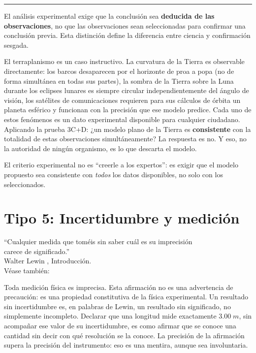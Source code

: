 \documentclass[11pt]{book}
\begin{document}
\begin{enumerate}
\begin{description}
\end{description}
\end{enumerate}

\medskip
\noindent\rule{\linewidth}{0.4pt}


\medskip
El análisis experimental exige que la conclusión sea {\bf deducida de las observaciones}, no que las observaciones sean seleccionadas para confirmar una conclusión previa. Esta distinción define la diferencia entre ciencia y confirmación sesgada.

El terraplanismo es un caso instructivo. La curvatura de la Tierra es observable directamente: los barcos desaparecen por el horizonte de proa a popa (no de forma simultánea en todas sus partes), la sombra de la Tierra sobre la Luna durante los eclipses lunares es siempre circular independientemente del ángulo de visión, los satélites de comunicaciones requieren para sus cálculos de órbita un planeta esférico y funcionan con la precisión que ese modelo predice. Cada uno de estos fenómenos es un dato experimental disponible para cualquier ciudadano. Aplicando la prueba 3C+D: ¿un modelo plano de la Tierra es {\bf consistente} con la totalidad de estas observaciones simultáneamente? La respuesta es no. Y eso, no la autoridad de ningún organismo, es lo que descarta el modelo.

El criterio experimental no es ``creerle a los expertos'': es exigir que el modelo propuesto sea consistente con {\it todos} los datos disponibles, no solo con los seleccionados.

\section{Tipo 5: Incertidumbre y medición}

{\small
\begin{flushright}
	``Cualquier medida que toméis sin saber cuál es su imprecisión\\
	carece de significado.''\\
	Walter Lewin \cite{Lewin2011}, Introducción.\\
	{\upshape\small Véase también: \cite{Lewin2011video}}
\end{flushright}
}

\medskip
Toda medición física es imprecisa. Esta afirmación no es una advertencia de precaución: es una propiedad constitutiva de la física experimental. Un resultado sin incertidumbre es, en palabras de Lewin, un resultado sin significado, no simplemente incompleto. Declarar que una longitud mide exactamente $3.00\;m$, sin acompañar ese valor de su incertidumbre, es como afirmar que se conoce una cantidad sin decir con qué resolución se la conoce. La precisión de la afirmación supera la precisión del instrumento: eso es una mentira, aunque sea involuntaria.
\end{document}
